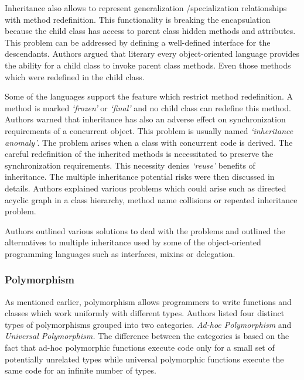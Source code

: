 \documentclass[12pt,twoside,a4paper]{report}
\begin{document}
Inheritance also allows to represent generalization /specialization relationships with method redefinition. This functionality is breaking the encapsulation because the child class has access to parent class hidden methods and attributes. This problem can be addressed by defining a well-defined interface for the descendants. Authors argued that literary every object-oriented language provides the ability for a child class to invoke parent class methods. Even those methods which were redefined in the child class.

Some of the languages support the feature which restrict method redefinition. A method is marked \textit{‘frozen’} or \textit{‘final’} and no child class can redefine this method. Authors warned that inheritance has also an adverse effect on synchronization requirements of a concurrent object. This problem is usually named \textit{‘inheritance anomaly’}. The problem arises when a class with concurrent code is derived. The careful redefinition of the inherited methods is necessitated to preserve the synchronization requirements. This necessity denies \textit{‘reuse’} benefits of inheritance. The multiple inheritance potential risks were then discussed in details. Authors explained various problems which could arise such as directed acyclic graph in a class hierarchy, method name collisions or repeated inheritance problem.\par
Authors outlined various solutions to deal with the problems and outlined the alternatives to multiple inheritance used by some of the object-oriented programming languages such as interfaces, mixins or delegation.

\subsubsection{Polymorphism}
As mentioned earlier, polymorphism allows programmers to write functions and classes which work uniformly with different types. Authors listed four distinct types of polymorphisms grouped into two categories. \textit{Ad-hoc Polymorphism} and \textit{Universal Polymorphism.} The difference between the categories is based on the fact that ad-hoc polymorphic functions execute code only for a small set of potentially unrelated types while universal polymorphic functions execute the same code for an infinite number of types.
\end{document}
